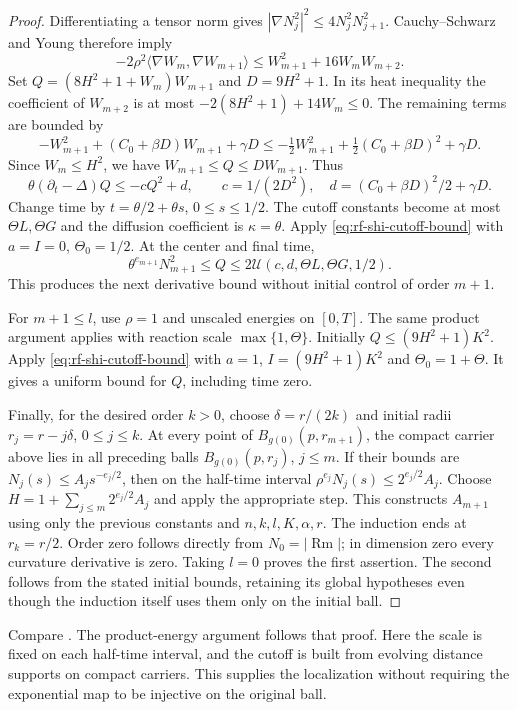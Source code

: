 \begin{proof}
Differentiating a tensor norm gives
$|\nabla N_j^2|^2\leq4N_j^2N_{j+1}^2$.  Cauchy--Schwarz and Young
therefore imply
\[
 -2\rho^2\langle\nabla W_m,\nabla W_{m+1}\rangle
 \leq W_{m+1}^2+16W_mW_{m+2}.
\]
Set $Q=(8H^2+1+W_m)W_{m+1}$ and $D=9H^2+1$.
In its heat inequality the coefficient of $W_{m+2}$ is at most
$-2(8H^2+1)+14W_m\leq0$.  The remaining terms are bounded by
\[
 -W_{m+1}^2+(C_0+\beta D)W_{m+1}+\gamma D
 \leq-\tfrac12 W_{m+1}^2+\tfrac12(C_0+\beta D)^2+\gamma D.
\]
Since $W_m\leq H^2$, we have $W_{m+1}\leq Q\leq DW_{m+1}$.
Thus
\[
 \theta(\partial_t-\Delta)Q\leq-cQ^2+d,
 \qquad c=1/(2D^2),\quad d=(C_0+\beta D)^2/2+\gamma D.
\]
Change time by $t=\theta/2+\theta s$, $0\leq s\leq1/2$.
The cutoff constants become at most $\Theta L,\Theta G$ and the
diffusion coefficient is $\kappa=\theta$.  Apply
\eqref{eq:rf-shi-cutoff-bound} with $a=I=0$, $\Theta_0=1/2$.
At the center and final time,
\[
 \theta^{e_{m+1}}N_{m+1}^2\leq Q
 \leq2\mathcal U(c,d,\Theta L,\Theta G,1/2).
\]
This produces the next derivative bound without initial control of
order $m+1$.

For $m+1\leq l$, use $\rho=1$ and unscaled energies on $[0,T]$.
The same product argument applies with reaction scale
$\max\{1,\Theta\}$.  Initially
$Q\leq(9H^2+1)K^2$.  Apply \eqref{eq:rf-shi-cutoff-bound} with
$a=1$, $I=(9H^2+1)K^2$ and $\Theta_0=1+\Theta$.
It gives a uniform bound for $Q$, including time zero.

Finally, for the desired order $k>0$, choose
$\delta=r/(2k)$ and initial radii $r_j=r-j\delta$, $0\leq j\leq k$.
At every point of $B_{g(0)}(p,r_{m+1})$, the compact carrier above lies
in all preceding balls $B_{g(0)}(p,r_j)$, $j\leq m$.
If their bounds are $N_j(s)\leq A_js^{-e_j/2}$, then on the half-time
interval $\rho^{e_j}N_j(s)\leq2^{e_j/2}A_j$.
Choose $H=1+\sum_{j\leq m}2^{e_j/2}A_j$ and apply the appropriate
step.  This constructs $A_{m+1}$ using only the previous constants and
$n,k,l,K,\alpha,r$.  The induction ends at $r_k=r/2$.
Order zero follows directly from $N_0=|\operatorname{Rm}|$;
in dimension zero every curvature derivative is zero.  Taking $l=0$
proves the first assertion.  The second follows from the stated initial
bounds, retaining its global hypotheses even though the induction
itself uses them only on the initial ball.
\end{proof}

Compare \cite[Theorems 3.28--3.29 and their proof, pp.~51--57]{MT2007}.
The product-energy argument follows that proof.  Here the scale is
fixed on each half-time interval, and the cutoff is built from evolving
distance supports on compact carriers.  This supplies the localization
without requiring the exponential map to be injective on the original
ball.

